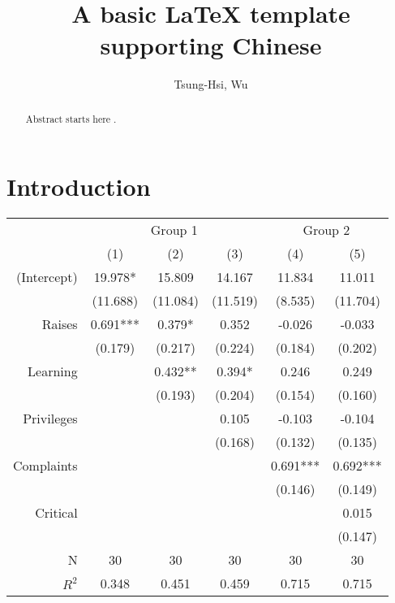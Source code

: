 \documentclass{article}
\title{A basic LaTeX template supporting Chinese}
\author{Tsung-Hsi, Wu\\
	\ttfamily{tsung.hsi@g.ncu.edu.tw}}
\begin{document}
\maketitle

\begin{abstract}
    Abstract starts here \citep{exampleArticle2022}.
\end{abstract}



\section{Introduction}
\begin{tabular}{r|ccc|cc}
                & \multicolumn{3}{c}{Group 1} & \multicolumn{2}{c}{Group 2}                                  \\
                & (1)                         & (2)                         & (3)      & (4)      & (5)      \\ \hline
    (Intercept) & 19.978*                     & 15.809                      & 14.167   & 11.834   & 11.011   \\
                & (11.688)                    & (11.084)                    & (11.519) & (8.535)  & (11.704) \\
    Raises      & 0.691***                    & 0.379*                      & 0.352    & -0.026   & -0.033   \\
                & (0.179)                     & (0.217)                     & (0.224)  & (0.184)  & (0.202)  \\
    Learning    &                             & 0.432**                     & 0.394*   & 0.246    & 0.249    \\
                &                             & (0.193)                     & (0.204)  & (0.154)  & (0.160)  \\
    Privileges  &                             &                             & 0.105    & -0.103   & -0.104   \\
                &                             &                             & (0.168)  & (0.132)  & (0.135)  \\
    Complaints  &                             &                             &          & 0.691*** & 0.692*** \\
                &                             &                             &          & (0.146)  & (0.149)  \\
    Critical    &                             &                             &          &          & 0.015    \\
                &                             &                             &          &          & (0.147)  \\ \hline
    N           & 30                          & 30                          & 30       & 30       & 30       \\
    $R^2$       & 0.348                       & 0.451                       & 0.459    & 0.715    & 0.715    \\
\end{tabular}
\end{document}

